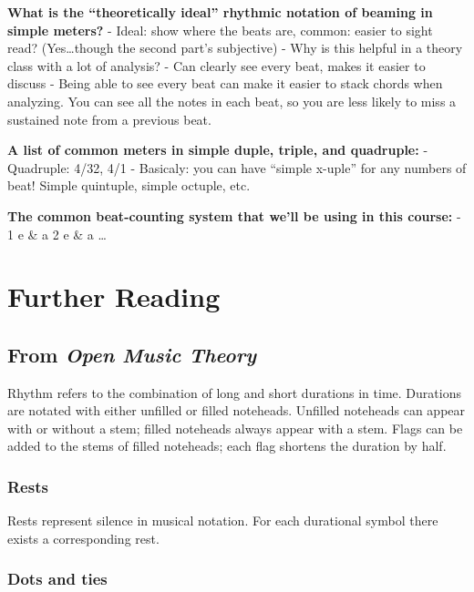 \documentclass{book}
\begin{document}
\textbf{What is the ``theoretically ideal'' rhythmic notation of beaming in
simple meters?} - Ideal: show where the beats are, common: easier to sight
read? (Yes\ldots though the second part's subjective) - Why is this helpful in
a theory class with a lot of analysis? - Can clearly see every beat, makes it
easier to discuss - Being able to see every beat can make it easier to stack
chords when analyzing. You can see all the notes in each beat, so you are less
likely to miss a sustained note from a previous beat.

\textbf{A list of common meters in simple duple, triple, and quadruple:} -
Quadruple: 4/32, 4/1 - Basicaly: you can have ``simple x-uple'' for any
numbers of beat! Simple quintuple, simple octuple, etc.

\textbf{The common beat-counting system that we'll be using in this course:} -
1 e \& a 2 e \& a \ldots{}

\hypertarget{further-reading-6}{%
\chapter{Further Reading}\label{further-reading-6}}

\hypertarget{from-open-music-theory-7}{%
\section{\texorpdfstring{From \emph{Open Music
Theory}}{From Open Music Theory}}\label{from-open-music-theory-7}}

Rhythm refers to the combination of long and short durations in time.
Durations are notated with either unfilled or filled noteheads. Unfilled
noteheads can appear with or without a stem; filled noteheads always appear
with a stem. Flags can be added to the stems of filled noteheads; each flag
shortens the duration by half.

\hypertarget{rests}{%
\subsection{Rests}\label{rests}}

Rests represent silence in musical notation. For each durational symbol there
exists a corresponding rest.

\hypertarget{dots-and-ties}{%
\subsection{Dots and ties}\label{dots-and-ties}}
\end{document}
